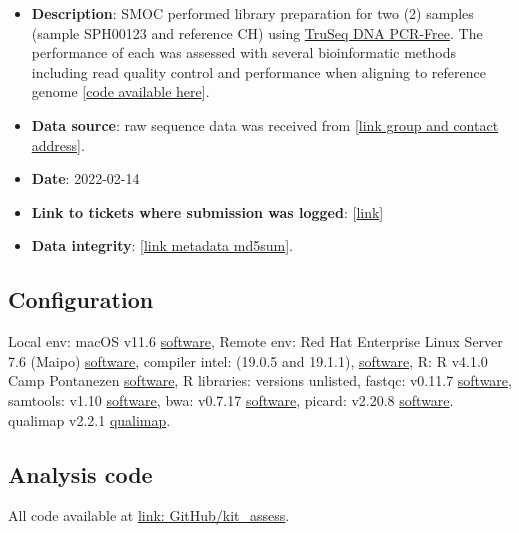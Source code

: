 \documentclass{article}
\begin{document}
\begin{itemize}
\item \textbf{Description}: SMOC performed library preparation for two (2) samples (sample SPH00123 and reference CH) using \href{https://www.sophiagenetics.com/clinical/oncology/solid-tumors/}{TruSeq DNA PCR-Free}.
The performance of each was assessed with several bioinformatic methods including read quality control and performance when aligning to reference genome
[\href{https://github.com/DylanLawless/kit_assess}{code available here}].
\item \textbf{Data source}: raw sequence data was received from
 [\href{https://www.sophiagenetics.com}{link group and contact address}].
\item \textbf{Date}: 2022-02-14
\item \textbf{Link to tickets where submission was logged}: [\href{https://www.sophiagenetics.com}{link}]
\item \textbf{Data integrity}: [\href{https://github.com/DylanLawless/kit_assess/blob/master/src/raw.md5sum}{link metadata md5sum}].
\end{itemize}

\subsection{Configuration}

Local env: macOS v11.6 \href{https://support.apple.com/macos}{software},
Remote env: Red Hat Enterprise Linux Server 7.6 (Maipo)  \href{https://www.redhat.com/en/technologies/linux-platforms/enterprise-linux}{software},
compiler intel: (19.0.5 and 19.1.1),
\href{https://www.intel.com/content/www/us/en/developer/tools/oneapi/commercial-base-hpc.html#gs.ppyt3x}{software},
R: R v4.1.0 Camp Pontanezen  \href{https://www.r-project.org}{software},
R libraries: versions unlisted,
fastqc: v0.11.7 \href{https://www.bioinformatics.babraham.ac.uk/projects/fastqc/}{software},
samtools: v1.10 \href{https://www.htslib.org}{software},
bwa: v0.7.17 \href{https://janis.readthedocs.io/en/latest/tools/bioinformatics/bwa/bwamem.html}{software},
picard: v2.20.8  \href{http://broadinstitute.github.io/picard/}{software}.
qualimap v2.2.1 \href{http://qualimap.conesalab.org}{qualimap}.

\subsection{Analysis code}
All code available at \href{https://github.com/DylanLawless/kit_assess}{link: GitHub/kit\_assess}. 
\end{document}

